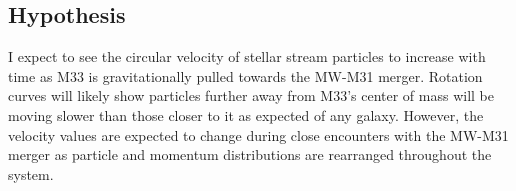 \documentclass[linenumbers,trackchanges]{aastex7}
\begin{document}
\subsection{Hypothesis}
I expect to see the circular velocity of stellar stream particles to increase with time as M33 is gravitationally pulled towards the MW-M31 merger. Rotation curves will likely show particles further away from M33's center of mass will be moving slower than those closer to it as expected of any galaxy. However, the velocity values are expected to change during close encounters with the MW-M31 merger as particle and momentum distributions are rearranged throughout the system.
\newline


{}

\end{document}
